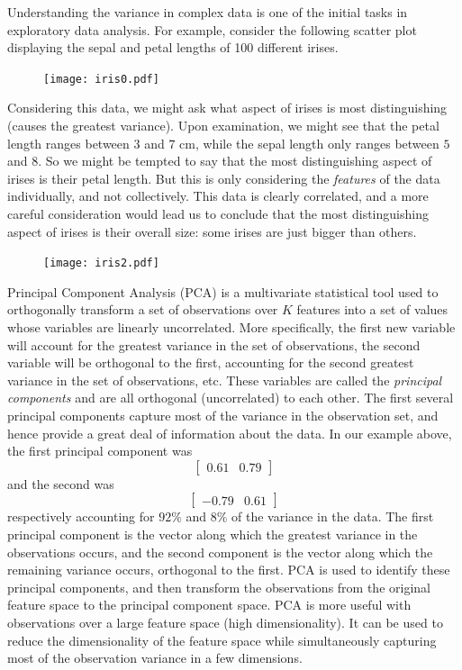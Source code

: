 
Understanding the variance in complex data is one of the initial tasks in exploratory data analysis. For example, consider the following scatter plot displaying the sepal and petal lengths of 100 different irises.
\begin{figure}
\texttt{[image: iris0.pdf]}
\end{figure}
Considering this data, we might ask what aspect of irises is most distinguishing (causes the greatest variance). Upon examination, we might see that the petal length ranges between $3$ and $7$ cm, while the sepal length only ranges between $5$ and $8$. So we might be tempted to say that the most distinguishing aspect of irises is their petal length.
But this is only considering the \emph{features} of the data individually, and not collectively. This data is clearly correlated, and a more careful consideration would lead us to conclude that the most distinguishing aspect of irises is their overall size: some irises are just bigger than others.
\begin{figure}
\texttt{[image: iris2.pdf]}
\end{figure}

Principal Component Analysis (PCA) is a multivariate statistical tool used to orthogonally transform a set of observations over $K$ features into a set of values whose variables are linearly uncorrelated. More specifically, the first new variable will account for the greatest variance in the set of observations, the second variable will be orthogonal to the first, accounting for the second greatest variance in the set of observations, etc. These variables are called the \emph{principal components} and are all orthogonal (uncorrelated) to each other. The first several principal components capture most of the variance in the observation set, and hence provide a great deal of information about the data.
In our example above, the first principal component was \[\left[ \begin{array}{cc} 0.61 & 0.79 \end{array} \right] \]  and the second was \[\left[ \begin{array}{cc} -0.79 & 0.61 \end{array} \right] \] respectively accounting for $92\%$ and $8\%$ of the variance in the data. The first principal component is the vector along which the greatest variance in the observations occurs, and the second component is the vector along which the remaining variance occurs, orthogonal to the first. PCA is used to identify these principal components, and then transform the observations from the original feature space to the principal component space.
PCA is more useful with observations over a large feature space (high dimensionality). It can be used to reduce the dimensionality of the feature space while simultaneously capturing most of the observation variance in a few dimensions.

